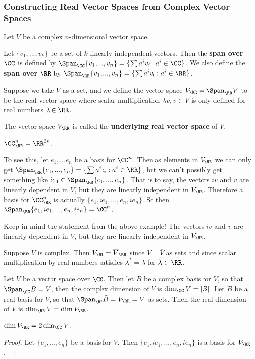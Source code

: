 \subsubsection{Constructing Real Vector Spaces from Complex Vector Spaces}
Let $V$ be a complex $n$-dimensional vector space.
\begin{defn}
    Let $\{v_1,...,v_k\}$ be a set of $k$ linearly independent vectors. Then the \textbf{span over $\CC$} is defined by $\Span_{\CC}\{v_1,...,v_n\} = \{\sum a^i v_i : a^i \in\CC\}$. We also define the \textbf{span over $\RR$} by $\Span_{\RR}\{v_1,...,v_n\} = \{\sum a^i v_i : a^i \in\RR\}$.
\end{defn}
\begin{defn}
    Suppose we take $V$ as a set, and we define the vector space $V_{\RR} = \Span_{\RR} V$ to be the real vector space where scalar multiplication $\lambda v, v\in V$ is only defined for real numbers $\lambda \in \RR$.

    The vector space $V_{\RR}$ is called the \textbf{underlying real vector space} of $V$.
\end{defn}
\begin{example}
    $\CC^n_{\RR} = \RR^{2n}$. 

To see this, let $e_1,...e_n$ be a basis for $\CC^n$. Then as elements in $V_{\RR}$ we can only get $\Span_{\RR}\{e_1,...,e_n\} = \{\sum a^i e_i : a^i \in \RR\}$, but we can't possibly get something like $ie_4 \in \Span_{\RR}\{e_1,...,e_n\}$. That is to say, the vectors $iv$ and $v$ are linearly dependent in $V$, but they are linearly independent in $V_{\RR}$. Therefore a basis for $\CC_{\RR}^n$ is actually $\{e_1,ie_1,...,e_n,ie_n\}$. So then $\Span_{\RR}\{e_1,ie_1,...,e_n,ie_n\} = \CC^n$.
\end{example}
\begin{remark*}
    Keep in mind the statement from the above example! The vectors $iv$ and $v$ are linearly dependent in $V$, but they are linearly independent in $V_{\RR}$.
\end{remark*}

\begin{remark*}
    Suppose $V$ is complex. Then $V_{\RR} = \overline{V}_{\RR}$ since $V=\overline{V}$ as sets and since scalar multiplication by real numbers satisfies $\lambda^* = \lambda$ for $\lambda\in\RR$.
\end{remark*}

\begin{defn}Let $V$ be a vector space over $\CC$. Then let $B$ be a complex basis for $V$, so that $\Span_{\CC} B = V$, then the complex dimension of $V$ is $\dim_{\CC} V = |B|$. Let $\tilde{B}$ be a real basis for $V$, so that $\Span_{\RR} \tilde{B} = V_{\RR} = V$ as sets. Then the real dimension of $V$ is $\dim_{\RR} V = \dim V_{\RR} $.
\end{defn}
\begin{lemma}
    $\dim V_{\RR} = 2\dim_{\CC} V$.
\end{lemma}
\begin{proof}
    Let $\{e_1,...,e_n\}$ be a basis for $V$. Then $\{e_1,ie_1,...,e_n,ie_n\}$ is a basis for $V_{\RR}$.
\end{proof}

